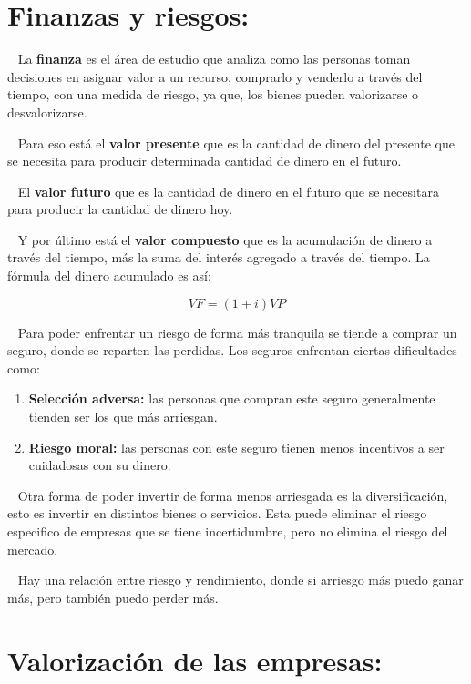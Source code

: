\documentclass[
  letterpaper,
  DIV=11,
  numbers=noendperiod]{scrreport}
\begin{document}
\hypertarget{finanzas-y-riesgos}{%
\section{Finanzas y riesgos:}\label{finanzas-y-riesgos}}

~ La \textbf{finanza} es el área de estudio que analiza como las
personas toman decisiones en asignar valor a un recurso, comprarlo y
venderlo a través del tiempo, con una medida de riesgo, ya que, los
bienes pueden valorizarse o desvalorizarse.

~ Para eso está el \textbf{valor presente} que es la cantidad de dinero
del presente que se necesita para producir determinada cantidad de
dinero en el futuro.

~ El \textbf{valor futuro} que es la cantidad de dinero en el futuro que
se necesitara para producir la cantidad de dinero hoy.

~ Y por último está el \textbf{valor compuesto} que es la acumulación de
dinero a través del tiempo, más la suma del interés agregado a través
del tiempo. La fórmula del dinero acumulado es así:

\[
VF=\left(1+i\right)VP
\]

~ Para poder enfrentar un riesgo de forma más tranquila se tiende a
comprar un seguro, donde se reparten las perdidas. Los seguros enfrentan
ciertas dificultades como:

\begin{enumerate}
\def\labelenumi{\arabic{enumi})}
\item
  \textbf{Selección adversa:} las personas que compran este seguro
  generalmente tienden ser los que más arriesgan.
\item
  \textbf{Riesgo moral:} las personas con este seguro tienen menos
  incentivos a ser cuidadosas con su dinero.
\end{enumerate}

~ Otra forma de poder invertir de forma menos arriesgada es la
diversificación, esto es invertir en distintos bienes o servicios. Esta
puede eliminar el riesgo especifico de empresas que se tiene
incertidumbre, pero no elimina el riesgo del mercado.

~ Hay una relación entre riesgo y rendimiento, donde si arriesgo más
puedo ganar más, pero también puedo perder más.

\hypertarget{valorizaciuxf3n-de-las-empresas}{%
\section{Valorización de las
empresas:}\label{valorizaciuxf3n-de-las-empresas}}
\end{document}
